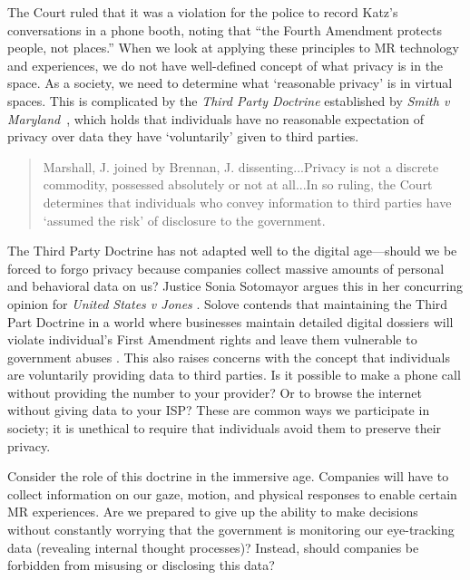 The Court ruled that it was a violation for the police to record Katz's conversations in a phone booth, noting that ``the Fourth Amendment protects people, not places.'' When we look at applying these principles to MR technology and experiences, we do not have well-defined concept of what privacy is in the space. As a society, we need to determine what `reasonable privacy' is in virtual spaces. This is complicated by the \emph{Third Party Doctrine} established by \emph{Smith v Maryland}~\cite{1979smith}, which holds that individuals have no reasonable expectation of privacy over data they have `voluntarily' given to third parties.

\begin{quote}
Marshall, J. joined by Brennan, J. dissenting...Privacy is not a discrete commodity, possessed absolutely or not at all...In so ruling, the Court determines that individuals who convey information to third parties have `assumed the risk' of disclosure to the government. 
\end{quote}

The Third Party Doctrine has not adapted well to the digital age---should we be forced to forgo privacy because companies collect massive amounts of personal and behavioral data on us? Justice Sonia Sotomayor argues this in her concurring opinion for \emph{United States v Jones} \cite{jones2012}. Solove contends that maintaining the Third Part Doctrine in a world where businesses maintain detailed digital dossiers will violate individual's First Amendment rights and leave them vulnerable to government abuses \cite{solove2001digital}. This also raises concerns with the concept that individuals are voluntarily providing data to third parties. Is it possible to make a phone call without providing the number to your provider? Or to browse the internet without giving data to your ISP? These are common ways we participate in society; it is unethical to require that individuals avoid them to preserve their privacy.

Consider the role of this doctrine in the immersive age. Companies will have to collect information on our gaze, motion, and physical responses to enable certain MR experiences. Are we prepared to give up the ability to make decisions without constantly worrying that the government is monitoring our eye-tracking data (revealing internal thought processes)? Instead, should companies be forbidden from misusing or disclosing this data? 


